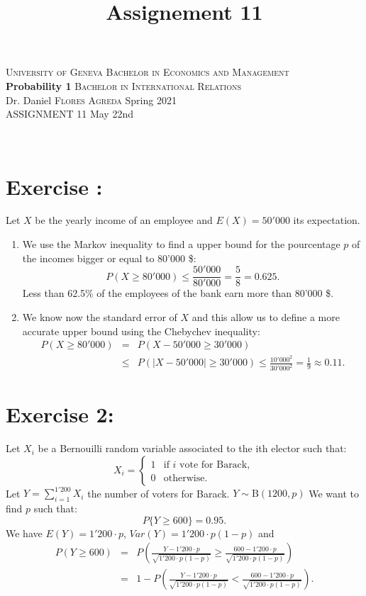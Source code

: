 \documentclass[12pt,thmsa]{article}\usepackage[]{graphicx}\usepackage[]{color}
\title{Assignement 11}
\begin{document}
\noindent \textsc{University of Geneva}     \hfill \textsc{Bachelor in Economics and Management} \\
\textbf{Probability 1}                      \hfill \textsc{Bachelor in International Relations} \\
Dr. Daniel \textsc{Flores Agreda}                 \hfill Spring 2021  \\
ASSIGNMENT 11                               \hfill   May 22nd



\noindent
\makebox[\linewidth]{\rule{\textwidth}{0.4pt}}\\[1.5ex]




\addtocounter{section}{1}
\section*{Exercise \thesection:}

Let $X$ be the yearly income of an employee and $E(X)=50'000$ its expectation.
\begin{enumerate}
  \item We use the Markov inequality to find a upper bound for the pourcentage $p$ of the incomes bigger or equal to 80'000 \$:
  \begin{equation*}
P(X \geq 80'000)\leq \frac{50'000}{80'000}=\frac{5}{8}=0.625.
  \end{equation*}
  Less than 62.5\% of the employees of the bank earn more than 80'000 \$.
  \item We know now the standard error of $X$  and this allow us to define a more accurate upper bound using the Chebychev inequality:
 \begin{eqnarray*}
 P(X\geq 80'000)&=& P(X-50'000\geq 30'000) \\
 &\leq&P(\vert X- 50'000\vert \geq 30'000)\leq \frac{10'000^2}{30'000^2}=\frac{1}{9} \approx 0.11.
 \end{eqnarray*}
\end{enumerate}




\section*{Exercise 2:}

Let $X_i$ be a Bernouilli random variable associated to the ith elector such that:
$$
X_i =\left\{
\begin{array}{ll}
1 & \mbox{if }i \mbox{ vote for Barack},\\
0 & \mbox{otherwise}.
\end{array}
\right.
$$
Let $\displaystyle Y=\sum_{i=1}^{1'200} X_i$ the number of voters for Barack. $Y\sim \mathrm B( 1200, p)$ We want to find $p$ such that:
$$
P\{Y\geq 600\} = 0.95.
$$
We have $E(Y)=1'200\cdot p$, $Var(Y)=1'200\cdot p(1-p)$ and
\begin{eqnarray*}
P (Y\geq 600) &=& P\left(\frac{Y-1'200 \cdot p}{\sqrt{1'200\cdot p(1-p)}} \geq \frac{600
- 1'200\cdot p}{\sqrt{1'200\cdot p(1-p)}}\right)   \\
&=& 1 -P\left(\frac{Y-1'200\cdot p}{\sqrt{1'200\cdot p(1-p)}} < \frac{600
- 1'200\cdot p}{\sqrt{1'200\cdot p(1-p)}}\right).
\end{eqnarray*}
\end{document}
